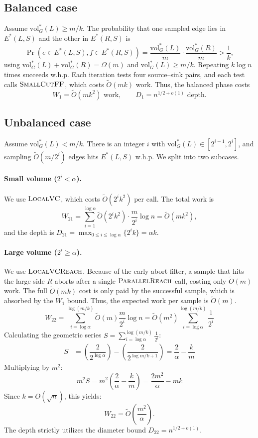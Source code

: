 \documentclass[11pt]{article}
\theoremstyle{remark}
\newcommand{\tildeO}{\widetilde{O}}
\newcommand{\ParallelReach}{\textsc{ParallelReach}}
\newcommand{\LocalVC}{\textsc{LocalVC}}
\newcommand{\LocalVCReach}{\textsc{LocalVCReach}}
\newcommand{\SmallCutFF}{\textsc{SmallCutFF}}
\newcommand{\vol}{\mathrm{vol}}
\begin{document}
\subsection{Balanced case}
Assume \(\vol_G^*(L)\ge m/k\). The probability that one sampled edge lies in \(E^*(L,S)\) and the other in \(E^*(R,S)\) is
\[
\Pr(e\in E^*(L,S),f\in E^*(R,S))
= \frac{\vol_G^*(L)}{m}\cdot\frac{\vol_G^*(R)}{m}
> \frac{1}{k},
\]
using \(\vol_G^*(L)+\vol_G^*(R)=\Omega(m)\) and \(\vol_G^*(L)\ge m/k\). Repeating \(k\log n\) times succeeds w.h.p. Each iteration tests four source--sink pairs, and each test calls \(\SmallCutFF\), which costs \(\tildeO(mk)\) work. Thus, the balanced phase costs
\[
W_1=\tildeO(mk^2)\text{ work},\qquad D_1=n^{1/2+o(1)}\text{ depth}.
\]

\subsection{Unbalanced case}
Assume \(\vol_G^*(L)<m/k\). There is an integer \(i\) with \(\vol_G^*(L)\in[2^{i-1},2^i]\), and sampling \(\tildeO(m/2^i)\) edges hits \(E^*(L,S)\) w.h.p. We split into two subcases.

\paragraph{Small volume (\(2^i<\alpha\)).}
We use \(\LocalVC\), which costs \(\tildeO(2^i k^2)\) per call. The total work is
\[
W_{21}
= \sum_{i=1}^{\log\alpha} \tildeO(2^i k^2)\cdot\frac{m}{2^i}\log n
= \tildeO(mk^2),
\]
and the depth is \(D_{21}=\max_{0\le i\le \log\alpha}\{2^i k\}=\alpha k\).

\paragraph{Large volume (\(2^i\ge\alpha\)).}
We use \(\LocalVCReach\). Because of the early abort filter, a sample that hits the large side \(R\) aborts after a single \(\ParallelReach\) call, costing only \(\tildeO(m)\) work. The full \(\tildeO(mk)\) cost is only paid by the successful sample, which is absorbed by the \(W_1\) bound. Thus, the expected work per sample is \(\tildeO(m)\).
\[
W_{22} = \sum_{i=\log \alpha}^{\log (m/k)} \tildeO(m) \frac{m}{2^i} \log n = \tilde{O}(m^2) \sum_{i = \log \alpha}^{\log (m/k)} \frac{1}{2^i}
\]
Calculating the geometric series \( S = \sum_{i = \log \alpha}^{\log (m/k)} \frac{1}{2^i} \):
\begin{align*}
S &= \left( \dfrac{2}{2^{\log \alpha}} \right) - \left( \dfrac{2}{2^{\log m/k + 1}} \right) = \dfrac{2}{\alpha} - \dfrac{k}{m}
\end{align*}
Multiplying by \(m^2\):
\[
m^2 S = m^2 \left( \dfrac{2}{\alpha} - \dfrac{k}{m} \right) = \dfrac{2 m^2}{\alpha} - m k
\]
Since \(k = O(\sqrt{n})\), this yields:
\[
W_{22} = \tilde{O}\left(\frac{m^2}{\alpha}\right).
\]
The depth strictly utilizes the diameter bound \(D_{22}=n^{1/2+o(1)}\).
\end{document}
